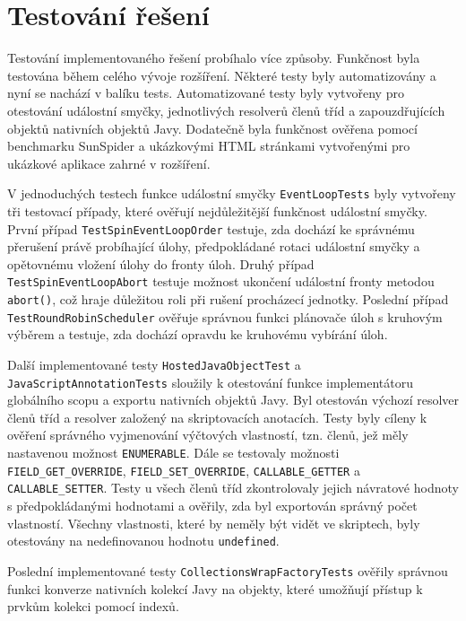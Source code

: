\section{Testování řešení}
\label{Chapter.Testing}

Testování implementovaného řešení probíhalo více způsoby. Funkčnost byla testována během celého vývoje rozšíření. Některé testy byly automatizovány a nyní se nachází v balíku tests. Automatizované testy byly vytvořeny pro otestování událostní smyčky, jednotlivých resolverů členů tříd a zapouzdřujících objektů nativních objektů Javy. Dodatečně byla funkčnost ověřena pomocí benchmarku SunSpider a ukázkovými HTML stránkami vytvořenými pro ukázkové aplikace zahrné v rozšíření.

V jednoduchých testech funkce událostní smyčky \texttt{EventLoopTests} byly vytvořeny tři testovací případy, které ověřují nejdůležitější funkčnost událostní smyčky. První případ \texttt{TestSpinEventLoopOrder} testuje, zda dochází ke správnému přerušení právě probíhající úlohy, předpokládané rotaci událostní smyčky a opětovnému vložení úlohy do fronty úloh. Druhý případ \texttt{TestSpinEventLoopAbort} testuje možnost ukončení událostní fronty metodou \texttt{abort()}, což hraje důležitou roli při rušení procházecí jednotky. Poslední případ \texttt{TestRoundRobinScheduler} ověřuje správnou funkci plánovače úloh s kruhovým výběrem a testuje, zda dochází opravdu ke kruhovému vybírání úloh.

Další implementované testy \texttt{HostedJavaObjectTest} a \texttt{JavaScriptAnnotationTests} sloužily k otestování funkce implementátoru globálního scopu a exportu nativních objektů Javy. Byl otestován výchozí resolver členů tříd a resolver založený na skriptovacích anotacích. Testy byly cíleny k ověření správného vyjmenování výčtových vlastností, tzn. členů, jež měly nastavenou možnost \texttt{ENUMERABLE}. Dále se testovaly možnosti \texttt{FIELD\_GET\_OVERRIDE}, \texttt{FIELD\_SET\_OVERRIDE}, \texttt{CALLABLE\_GETTER} a \texttt{CALLABLE\_SETTER}. Testy u všech členů tříd zkontrolovaly jejich návratové hodnoty s předpokládanými hodnotami a ověřily, zda byl exportován správný počet vlastností. Všechny vlastnosti, které by neměly být vidět ve skriptech, byly otestovány na nedefinovanou hodnotu \texttt{undefined}.

\newpage

Poslední implementované testy \texttt{CollectionsWrapFactoryTests} ověřily správnou funkci konverze nativních kolekcí Javy na objekty, které umožňují přístup k prvkům kolekci pomocí indexů. 

